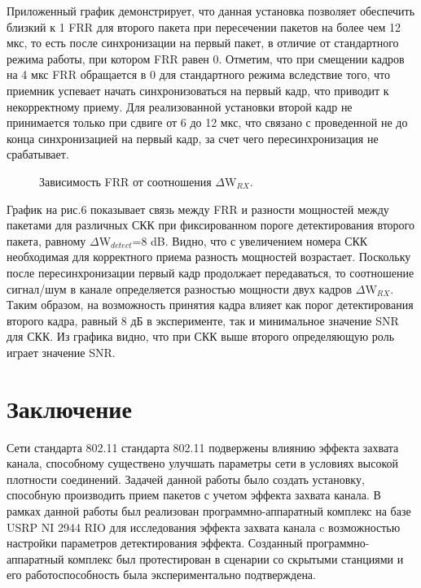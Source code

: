 \documentclass{llncs}
\begin{document}
Приложенный график демонстрирует, что данная установка позволяет обеспечить близкий к 1 FRR для второго пакета при пересечении пакетов на более чем 12 мкс, то есть после синхронизации на первый пакет, в отличие от стандартного режима работы, при котором FRR равен 0. Отметим, что при  смещении кадров на 4 мкс FRR обращается в 0 для стандартного режима вследствие того, что приемник успевает начать синхронизоваться на первый кадр, что приводит к некорректному приему. Для реализованной установки второй кадр не принимается только при сдвиге от 6 до 12 мкс, что связано с проведенной не до конца синхронизацией на первый кадр, за счет чего пересинхронизация не срабатывает.%
\\
\begin{figure}[htp!]
\caption{Зависимость FRR от соотношения $\Delta$W$_{RX}.$}
\label{ris:image}
\end{figure}
График на рис.6 показывает связь между FRR и разности мощностей между пакетами для различных СКК при фиксированном пороге детектирования второго пакета, равному $\Delta$W$_{detect}$=8 dB. Видно, что с  увеличением номера СКК необходимая для корректного приема разность мощностей возрастает. Поскольку после пересинхронизации первый кадр продолжает передаваться, то соотношение сигнал/шум в канале определяется разностью мощности двух кадров $\Delta$W$_{RX}$. Таким образом, на возможность принятия кадра влияет как порог детектирования второго кадра, равный 8 дБ в эксперименте, так и минимальное значение SNR для СКК. Из графика видно, что при СКК выше второго определяющую роль играет значение SNR.
\section{Заключение}
Сети стандарта 802.11 стандарта 802.11 подвержены влиянию эффекта захвата канала, способному существено улучшать параметры сети в условиях высокой плотности соединений.
Задачей данной работы было создать установку, способную производить прием пакетов  с учетом эффекта захвата канала.
В рамках данной работы был реализован программно-аппаратный комплекс на базе USRP NI 2944 RIO для исследования эффекта захвата канала c возможностью настройки параметров  детектирования эффекта. Созданный программно-аппаратный комплекс был протестирован в сценарии со скрытыми станциями и его работоспособность была экспериментально подтверждена. 
 

%





%
\end{document}

